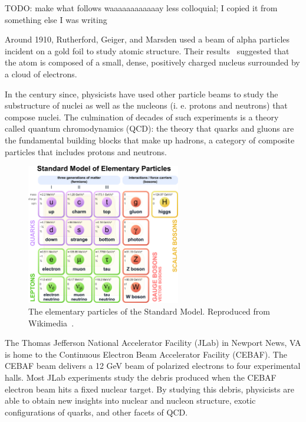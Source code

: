 TODO: make what follows waaaaaaaaaaaay less colloquial; I copied it from something else I was writing

Around 1910, Rutherford, Geiger, and Marsden used a beam of alpha particles
incident on a gold foil to study atomic structure.
Their results~\cite{Rutherford_1911} suggested that the atom is composed of a
small, dense, positively charged nucleus surrounded by a cloud of electrons.

In the century since, physicists have used other particle beams to study the
substructure of nuclei as well as the nucleons (i.  e.  protons and neutrons)
that compose nuclei.
The culmination of decades of such experiments is a theory called quantum
chromodynamics (QCD): the theory that quarks and gluons are the fundamental
building blocks that make up hadrons, a category of composite particles that
includes protons and neutrons.

\begin{figure}[!h]
    \centering
    \includegraphics[width=0.6\textwidth]{chap1/Standard_Model_of_Elementary_Particles.pdf}
    \caption{The elementary particles of the Standard Model. Reproduced from
             Wikimedia~\cite{standard_model_wikimedia}.
            }
    \label{fig:Standard_Model_of_Elementary_Particles}
\end{figure}

The Thomas Jefferson National Accelerator Facility (JLab) in Newport News, VA
is home to the Continuous Electron Beam Accelerator Facility (CEBAF).
The CEBAF beam delivers a 12 GeV beam of polarized electrons to four
experimental halls.
Most JLab experiments study the debris produced when the CEBAF electron beam
hits a fixed nuclear target.
By studying this debris, physicists are able to obtain new insights into
nuclear and nucleon structure, exotic configurations of quarks, and other
facets of QCD.

